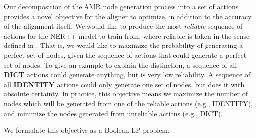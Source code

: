 Our decomposition of the AMR node generation process into a set of actions 
  provides a novel objective for the aligner to optimize, in addition to the
  accuracy of the alignment itself.
We would like to produce the most \textit{reliable}
  sequence of actions for the NER++ model to train from, where reliable is taken
  in the sense defined in .
That is, we would like to maximize the probability of generating a perfect set of
  nodes, given the sequence of actions that could generate a perfect set of nodes.
To give an example to explain the distinction, a sequence of all \textbf{DICT} actions could generate anything, but is very low reliability.
A sequence of all \textbf{IDENTITY} actions could only generate one set of nodes, but does it with absolute certainty.
In practice, this objective means we maximize the number of nodes which will be generated
  from one of the reliable actions (e.g., IDENTITY), and minimize the nodes
  generated from unreliable actions (e.g., DICT).




We formulate this objective as a Boolean LP problem.

